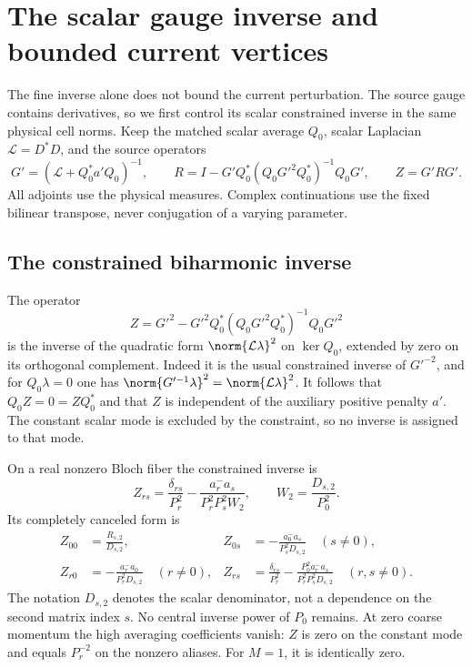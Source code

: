 \section{The scalar gauge inverse and bounded current vertices}
\label{gauge-section}

The fine inverse alone does not bound the current perturbation.
The source gauge contains derivatives, so we first control its
scalar constrained inverse in the same physical cell norms.
Keep the matched scalar average $Q_0$, scalar Laplacian
$\mathcal L=D^*D$, and the source operators
\[
 G'=(\mathcal L+Q_0^*a'Q_0)^{-1},\qquad
 R=I-G'Q_0^*(Q_0G'^2Q_0^*)^{-1}Q_0G',
 \qquad Z=G'RG'.
\]
All adjoints use the physical measures. Complex continuations use
the fixed bilinear transpose, never conjugation of a varying parameter.

\subsection{The constrained biharmonic inverse}

The operator
\[
 Z=G'^2-G'^2Q_0^*(Q_0G'^2Q_0^*)^{-1}Q_0G'^2
\]
is the inverse of the quadratic form $\norm{\mathcal L\lambda}^2$
on $\ker Q_0$, extended by zero on its orthogonal complement.
Indeed it is the usual constrained inverse of $G'^{-2}$, and for
$Q_0\lambda=0$ one has
$\norm{G'^{-1}\lambda}^2=\norm{\mathcal L\lambda}^2$.
It follows that $Q_0Z=0=ZQ_0^*$ and that $Z$ is independent of
the auxiliary positive penalty $a'$. The constant scalar mode is
excluded by the constraint, so no inverse is assigned to that mode.

On a real nonzero Bloch fiber the constrained inverse is
\[
 Z_{rs}=\frac{\delta_{rs}}{P_r^2}
 -\frac{a_r^-a_s}{P_r^2P_s^2W_2},
 \qquad W_2=\frac{D_{s,2}}{P_0^2}.
\]
Its completely canceled form is
\begin{align}
 Z_{00}&=\frac{R_{s,2}}{D_{s,2}},
 &Z_{0s}&=-\frac{a_0^-a_s}{P_s^2D_{s,2}}\quad(s\ne0),
 \label{gauge-Z-central}\\
 Z_{r0}&=-\frac{a_r^-a_0}{P_r^2D_{s,2}}\quad(r\ne0),
 &Z_{rs}&=\frac{\delta_{rs}}{P_r^2}
       -\frac{P_0^2a_r^-a_s}{P_r^2P_s^2D_{s,2}}
          \quad(r,s\ne0).
 \label{gauge-Z-high}
\end{align}
The notation $D_{s,2}$ denotes the scalar denominator, not a
dependence on the second matrix index $s$. No central inverse
power of $P_0$ remains. At zero coarse momentum the high averaging
coefficients vanish: $Z$ is zero on the constant mode and equals
$P_r^{-2}$ on the nonzero aliases. For $M=1$, it is identically zero.

